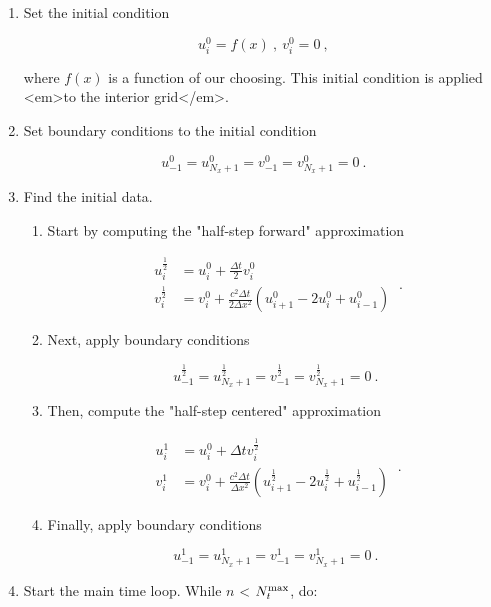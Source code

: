 \documentclass[a4paper,11pt]{article}
\begin{document}
\begin{enumerate}
\item Set the initial condition

$$
\boxed{u^{0}_{i} = f(x)\ ,\ v^{0}_{i} = 0 }\ ,
$$

where $f(x)$ is a function of our choosing. This initial condition is applied <em>to the interior grid</em>.

\item Set boundary conditions to the initial condition

$$
\boxed{u^{0}_{-1} = u^{0}_{N_{x}+1} = v^{0}_{-1} = v^{0}_{N_{x}+1} = 0}\ .
$$

\item Find the initial data.

  \begin{enumerate}

    \item Start by computing the "half-step forward" approximation

$$
\boxed{
\begin{aligned}
u^{\frac{1}{2}}_{i} &= u^{0}_{i} + \frac{\Delta t}{2}v^{0}_{i}\\
v^{\frac{1}{2}}_{i} &= v^{0}_{i} + \frac{c^{2}\Delta t}{2\Delta x^{2}}\left(u^{0}_{i+1}-2u^{0}_{i}+u^{0}_{i-1}\right)
\end{aligned}
}\ .
$$

    \item Next, apply boundary conditions

$$
\boxed{u^{\frac{1}{2}}_{-1} = u^{\frac{1}{2}}_{N_{x}+1} = v^{\frac{1}{2}}_{-1} = v^{\frac{1}{2}}_{N_{x}+1} = 0}\ .
$$

    \item Then, compute the "half-step centered" approximation

$$
\boxed{
\begin{aligned}
u^{1}_{i} &= u^{0}_{i} + \Delta t v^{\frac{1}{2}}_{i}\\
v^{1}_{i} &= v^{0}_{i} + \frac{c^{2}\Delta t}{\Delta x^{2}}\left(u^{\frac{1}{2}}_{i+1}-2u^{\frac{1}{2}}_{i}+u^{\frac{1}{2}}_{i-1}\right)
\end{aligned}
}\ .
$$

    \item Finally, apply boundary conditions

$$
\boxed{u^{1}_{-1} = u^{1}_{N_{x}+1} = v^{1}_{-1} = v^{1}_{N_{x}+1} = 0}\ .
$$
\end{enumerate}

\item Start the main time loop. While $n$ < $N_{t}^{\rm max}$, do:
  \begin{enumerate}
  

\end{enumerate}
\end{enumerate}
\end{document}

